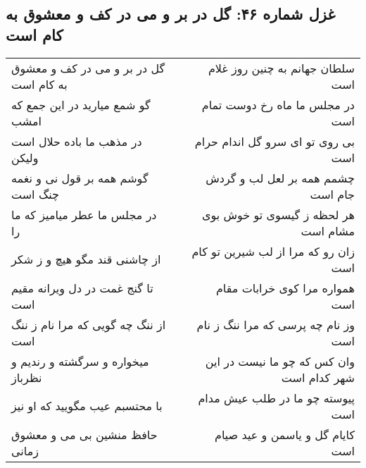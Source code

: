 \begin{center}
\section*{غزل شماره ۴۶: گل در بر و می در کف و معشوق به کام است}
\label{sec:sh046}
\begin{longtable}{l p{0.5cm} r}
گل در بر و می در کف و معشوق به کام است
&&
سلطان جهانم به چنین روز غلام است
\\
گو شمع میارید در این جمع که امشب
&&
در مجلس ما ماه رخ دوست تمام است
\\
در مذهب ما باده حلال است ولیکن
&&
بی روی تو ای سرو گل اندام حرام است
\\
گوشم همه بر قول نی و نغمه چنگ است
&&
چشمم همه بر لعل لب و گردش جام است
\\
در مجلس ما عطر میامیز که ما را
&&
هر لحظه ز گیسوی تو خوش بوی مشام است
\\
از چاشنی قند مگو هیچ و ز شکر
&&
زان رو که مرا از لب شیرین تو کام است
\\
تا گنج غمت در دل ویرانه مقیم است
&&
همواره مرا کوی خرابات مقام است
\\
از ننگ چه گویی که مرا نام ز ننگ است
&&
وز نام چه پرسی که مرا ننگ ز نام است
\\
میخواره و سرگشته و رندیم و نظرباز
&&
وان کس که چو ما نیست در این شهر کدام است
\\
با محتسبم عیب مگویید که او نیز
&&
پیوسته چو ما در طلب عیش مدام است
\\
حافظ منشین بی می و معشوق زمانی
&&
کایام گل و یاسمن و عید صیام است
\\
\end{longtable}
\end{center}
